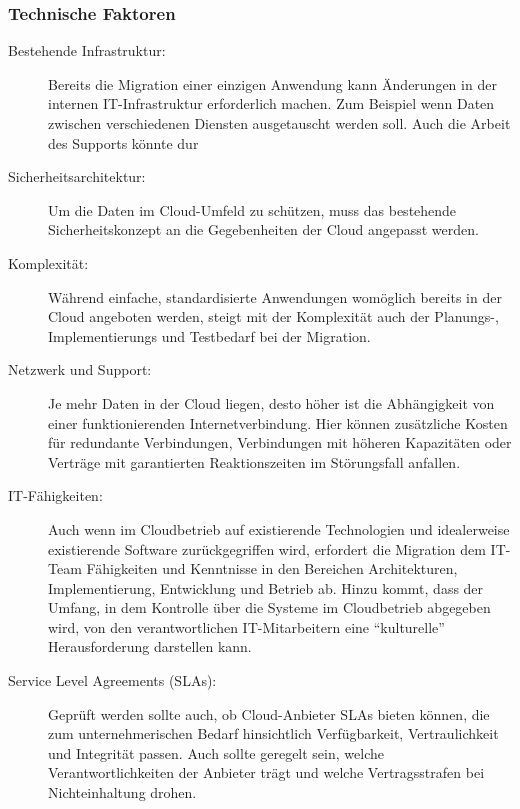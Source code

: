 \subsubsection{Technische Faktoren}
\begin{description}
	\item[Bestehende Infrastruktur:] Bereits die Migration einer 
einzigen Anwendung kann Änderungen in der internen IT-Infrastruktur 
erforderlich machen. Zum Beispiel wenn Daten zwischen verschiedenen Diensten 
ausgetauscht werden soll. Auch die Arbeit des Supports könnte dur
	
	\item[Sicherheitsarchitektur:] Um die Daten im Cloud-Umfeld zu 
schützen, muss das bestehende Sicherheitskonzept an die Gegebenheiten der Cloud 
angepasst werden.

	\item[Komplexität:]
	Während einfache, standardisierte Anwendungen womöglich bereits in der 
Cloud angeboten werden, steigt mit der Komplexität auch der Planungs-, 
Implementierungs und Testbedarf bei der Migration.
	
	\item[Netzwerk und Support:] Je mehr Daten in der Cloud liegen, desto 
höher ist die Abhängigkeit von einer funktionierenden Internetverbindung. Hier 
können zusätzliche Kosten für redundante Verbindungen, Verbindungen mit höheren 
Kapazitäten oder Verträge mit garantierten Reaktionszeiten im Störungsfall 
anfallen. 

	\item[IT-Fähigkeiten:] Auch wenn im Cloudbetrieb auf existierende 
Technologien und idealerweise existierende Software zurückgegriffen wird, 
erfordert die Migration dem IT-Team Fähigkeiten und Kenntnisse in den Bereichen 
Architekturen, Implementierung, Entwicklung und Betrieb ab. Hinzu kommt, dass 
der Umfang, in dem Kontrolle über die Systeme im Cloudbetrieb abgegeben wird, 
von den verantwortlichen IT-Mitarbeitern eine "`kulturelle"' Herausforderung 
darstellen kann.
	
	\item[Service Level Agreements (SLAs):] Geprüft werden sollte auch, ob 
Cloud-Anbieter SLAs bieten können, die zum unternehmerischen Bedarf 
hinsichtlich Verfügbarkeit, Vertraulichkeit und Integrität passen. Auch sollte 
geregelt sein, welche Verantwortlichkeiten der Anbieter trägt und welche 
Vertragsstrafen bei Nichteinhaltung drohen.
\end{description}


